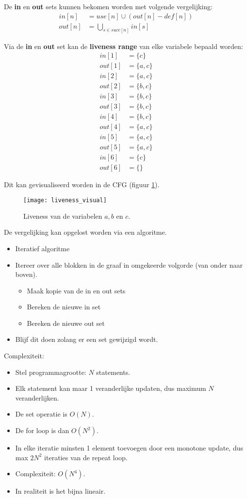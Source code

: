 De \textbf{in} en \textbf{out} sets kunnen bekomen worden met volgende vergelijking:
\begin{align*}
	in[n] & = use[n] \cup (out[n] - def[n]) \\
	out[n] & = \bigcup_{s \in succ[n]} in[s]
\end{align*}

Via de \textbf{in} en \textbf{out} set kan de \textbf{liveness range} van elke variabele bepaald worden:
\begin{align*}
in[1] & = \{c\} \\
out[1] & = \{a, c\}\\
in[2] & = \{a, c\}\\
out[2] & = \{b, c\}\\
in[3] & = \{b, c\}\\
out[3] & = \{b, c\}\\
in[4] & = \{b, c\}\\
out[4] & = \{a, c\}\\
in[5] & = \{a, c\}\\
out[5] & = \{a, c\}\\
in[6] & = \{c\}\\
out[6] & = \{ \}
\end{align*}

Dit kan gevisualiseerd worden in de CFG (figuur \ref{fig:liveness_visual}).
\begin{figure}[ht]
	\texttt{[image: liveness\_visual]}
	\caption{Liveness van de variabelen $a, b$ en $c$.}
	\label{fig:liveness_visual}
\end{figure}

De vergelijking kan opgelost worden via een algoritme.
\begin{itemize}
	\item Iteratief algoritme
	\item Itereer over alle blokken in de graaf in omgekeerde volgorde (van onder naar boven).
	\begin{itemize}
		\item Maak kopie van de in en out sets
		\item Bereken de nieuwe in set
		\item Bereken de nieuwe out set
	\end{itemize}
	\item Blijf dit doen zolang er een set gewijzigd wordt.
\end{itemize}

Complexiteit:
\begin{itemize}
	\item Stel programmagrootte: $N$ statements.
	\item Elk statement kan maar 1 veranderlijke updaten, dus maximum $N$ veranderlijken.
	\item De set operatie is $O(N)$.
	\item De for loop is dan $O(N^2)$.
	\item In elke iteratie minsten 1 element toevoegen door een monotone update, dus max $2N^2$ iteraties van de repeat loop.
	\item Complexiteit: $O(N^4)$.
	\item In realiteit is het bijna lineair.
\end{itemize}

